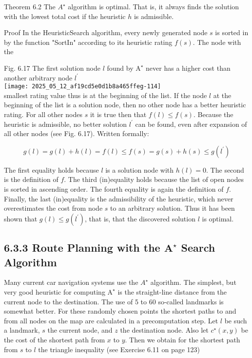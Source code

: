 \documentclass[10pt]{article}
\begin{document}
Theorem 6.2 The $A^{\star}$ algorithm is optimal. That is, it always finds the solution with the lowest total cost if the heuristic $h$ is admissible.

Proof In the HeuristicSearch algorithm, every newly generated node $s$ is sorted in by the function "SortIn" according to its heuristic rating $f(s)$. The node with the

Fig. 6.17 The first solution node $l$ found by $\mathrm{A}^{\star}$ never has a higher cost than another arbitrary node $l^{\prime}$\\
\texttt{[image: 2025\_05\_12\_af19cd5e0d1b8a465ffeg-114]}\\
smallest rating value thus is at the beginning of the list. If the node $l$ at the beginning of the list is a solution node, then no other node has a better heuristic rating. For all other nodes $s$ it is true then that $f(l) \leq f(s)$. Because the heuristic is admissible, no better solution $l^{\prime}$ can be found, even after expansion of all other nodes (see Fig. 6.17). Written formally:

$$
g(l)=g(l)+h(l)=f(l) \leq f(s)=g(s)+h(s) \leq g\left(l^{\prime}\right)
$$

The first equality holds because $l$ is a solution node with $h(l)=0$. The second is the definition of $f$. The third (in)equality holds because the list of open nodes is sorted in ascending order. The fourth equality is again the definition of $f$. Finally, the last (in)equality is the admissibility of the heuristic, which never overestimates the cost from node $s$ to an arbitrary solution. Thus it has been shown that $g(l) \leq g\left(l^{\prime}\right)$, that is, that the discovered solution $l$ is optimal.

\subsection*{6.3.3 Route Planning with the $\mathbf{A}^{\star}$ Search Algorithm}
Many current car navigation systems use the $A^{\star}$ algorithm. The simplest, but very good heuristic for computing $\mathrm{A}^{\star}$ is the straight-line distance from the current node to the destination. The use of 5 to 60 so-called landmarks is somewhat better. For these randomly chosen points the shortest paths to and from all nodes on the map are calculated in a precomputation step. Let $l$ be such a landmark, $s$ the current node, and $z$ the destination node. Also let $c^{\star}(x, y)$ be the cost of the shortest path from $x$ to $y$. Then we obtain for the shortest path from $s$ to $l$ the triangle inequality (see Exercise 6.11 on page 123)
\end{document}
